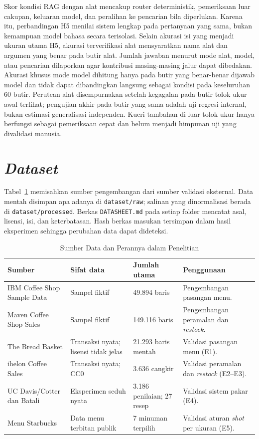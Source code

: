 Skor kondisi RAG dengan alat mencakup router deterministik, pemeriksaan luar cakupan, keluaran model, dan peralihan ke pencarian bila diperlukan. Karena itu, perbandingan H5 menilai sistem lengkap pada pertanyaan yang sama, bukan kemampuan model bahasa secara terisolasi. Selain akurasi isi yang menjadi ukuran utama H5, akurasi terverifikasi alat mensyaratkan nama alat dan argumen yang benar pada butir alat. Jumlah jawaban menurut mode alat, model, atau pencarian dilaporkan agar kontribusi masing-masing jalur dapat dibedakan. Akurasi khusus mode model dihitung hanya pada butir yang benar-benar dijawab model dan tidak dapat dibandingkan langsung sebagai kondisi pada keseluruhan 60 butir. Perutean alat disempurnakan setelah kegagalan pada butir tolok ukur awal terlihat; pengujian akhir pada butir yang sama adalah uji regresi internal, bukan estimasi generalisasi independen. Kueri tambahan di luar tolok ukur hanya berfungsi sebagai pemeriksaan cepat dan belum menjadi himpunan uji yang divalidasi manusia.

\section{\texorpdfstring{\textit{Dataset}}{Dataset}}
\label{sec:dataset}

Tabel~\ref{tab:dataset} memisahkan sumber pengembangan dari sumber validasi eksternal. Data mentah disimpan apa adanya di \texttt{dataset/raw}; salinan yang dinormalisasi berada di \texttt{dataset/processed}. Berkas \texttt{DATASHEET.md} pada setiap folder mencatat asal, lisensi, isi, dan keterbatasan. Hash berkas masukan tersimpan dalam hasil eksperimen sehingga perubahan data dapat dideteksi.

\begin{table}[htbp]
\centering
\caption{Sumber Data dan Perannya dalam Penelitian}
\label{tab:dataset}
\begin{tabular}{p{}p{}p{}p{}}
\toprule
Sumber & Sifat data & Jumlah utama & Penggunaan \\
\midrule
IBM Coffee Shop Sample Data & Sampel fiktif & 49.894 baris & Pengembangan pasangan menu. \\
Maven Coffee Shop Sales & Sampel fiktif & 149.116 baris & Pengembangan peramalan dan \textit{restock}. \\
The Bread Basket & Transaksi nyata; lisensi tidak jelas & 21.293 baris mentah & Validasi pasangan menu (E1). \\
ihelon Coffee Sales & Transaksi nyata; CC0 & 3.636 cangkir & Validasi peramalan dan \textit{restock} (E2--E3). \\
UC Davis/Cotter dan Batali & Eksperimen seduh nyata & 3.186 penilaian; 27 resep & Validasi sistem pakar (E4). \\
Menu Starbucks & Data menu terbitan publik & 7 minuman terpilih & Validasi aturan \textit{shot} per ukuran (E5). \\
\bottomrule
\end{tabular}
\end{table}


